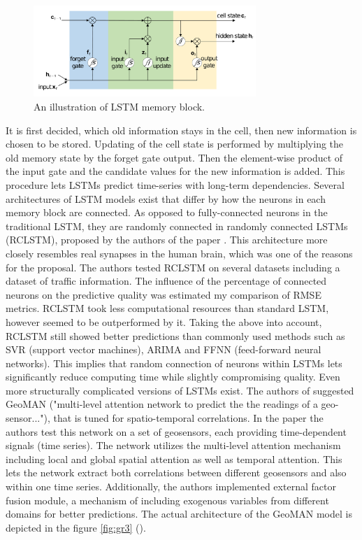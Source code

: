 \documentclass[13pt, a4paper]{article}
\begin{document}
\begin{enumerate}
\begin{figure}[t]\vspace*{4pt}
	\centerline{\includegraphics[width=0.75\textwidth]{./visuals/gr2.pdf}}
\caption{An illustration of LSTM memory block.}
\label{fig:gr2}
\end{figure}
It is first decided, which old information stays in the cell, then new information is chosen to be stored. Updating of the cell state is performed by multiplying the old memory state by the forget gate output. Then the element-wise product of the input gate and the candidate values for the new information is added. This procedure lets LSTMs predict time-series with long-term dependencies. Several architectures of LSTM models exist that differ by how the neurons in each memory block are connected. As opposed to fully-connected neurons in the traditional LSTM, they are randomly connected in randomly connected LSTMs (RCLSTM), proposed by the authors of the paper \cite{hua2019deep}. This architecture more closely resembles real synapses in the human brain, which was one of the reasons for the proposal. The authors tested RCLSTM on several datasets including a dataset of traffic information. The influence of the percentage of connected neurons on the predictive quality was estimated my comparison of RMSE metrics. RCLSTM took less computational resources than standard LSTM, however seemed to be outperformed by it. Taking the above into account, RCLSTM still showed better predictions than commonly used methods such as SVR (support vector machines), ARIMA and FFNN (feed-forward neural networks). This implies that random connection of neurons within LSTMs lets significantly reduce computing time while slightly compromising quality.
Even more structurally complicated versions of LSTMs exist. The authors of \cite{liang2018geoman} suggested GeoMAN ("multi-level attention network to predict the the readings of a geo-sensor..."), that is tuned for spatio-temporal correlations. In the paper the authors test this network on a set of geosensors, each providing time-dependent signals (time series). The network utilizes the multi-level attention mechanism including local and global spatial attention as well as temporal attention. This lets the network extract both correlations between different geosensors and also within one time series. Additionally, the authors implemented external factor fusion module, a mechanism of including exogenous variables from different domains for better predictions. The actual architecture of the GeoMAN model is depicted in the figure \ref{fig:gr3} (\cite{liang2018geoman}).

\end{enumerate}
\end{document}
